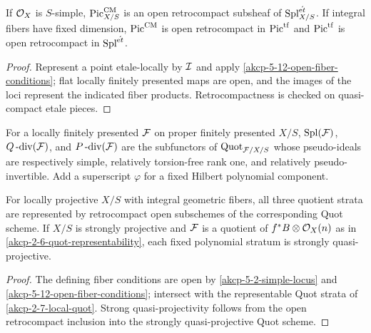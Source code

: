 \begin{proposition}
\label{akcp-5-13-picard-open}
If $\mathcal O_X$ is $S$-simple, $\operatorname{Pic}^{\mathrm{CM}}_{X/S}$ is an open retrocompact
subsheaf of $\operatorname{Spl}^{\acute{\mathrm et}}_{X/S}$.  If integral fibers have fixed
dimension, $\operatorname{Pic}^{\mathrm{CM}}$ is open retrocompact in $\operatorname{Pic}^{\mathrm{tf}}$ and
$\operatorname{Pic}^{\mathrm{tf}}$ is open retrocompact in $\operatorname{Spl}^{\acute{\mathrm et}}$.
\end{proposition}
\begin{proof}
Represent a point etale-locally by $\mathcal I$ and apply
\cref{akcp-5-12-open-fiber-conditions}; flat locally finitely presented maps
are open, and the images of the loci represent the indicated fiber products.
Retrocompactness is checked on quasi-compact etale pieces.
\end{proof}

\begin{definition}
\label{akcp-5-14-quot-strata}
For a locally finitely presented $\mathcal F$ on proper finitely presented $X/S$,
$\operatorname{Spl}(\mathcal F)$, $Q\operatorname{-div}(\mathcal F)$, and
$P\operatorname{-div}(\mathcal F)$ are the subfunctors of $\operatorname{Quot}_{\mathcal F/X/S}$ whose
pseudo-ideals are respectively simple, relatively torsion-free rank one, and
relatively pseudo-invertible.  Add a superscript $\varphi$ for a fixed Hilbert
polynomial component.
\end{definition}

\begin{proposition}
\label{akcp-5-15-quot-strata-representable}
For locally projective $X/S$ with integral geometric fibers, all three quotient
strata are represented by retrocompact open subschemes of the corresponding
Quot scheme.  If $X/S$ is strongly projective and $\mathcal F$ is a quotient of
$f^*B\otimes\mathcal O_X(n)$ as in \cref{akcp-2-6-quot-representability}, each fixed
polynomial stratum is strongly quasi-projective.
\end{proposition}
\begin{proof}
The defining fiber conditions are open by
\cref{akcp-5-2-simple-locus} and \cref{akcp-5-12-open-fiber-conditions}; intersect with
the representable Quot strata of \cref{akcp-2-7-local-quot}.  Strong
quasi-projectivity follows from the open retrocompact inclusion into the
strongly quasi-projective Quot scheme.
\end{proof}

